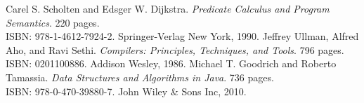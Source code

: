 \documentclass{article}
\begin{document}
\begin{thebibliography}{99}
 Carel S. Scholten and Edsger W. Dijkstra. \emph{Predicate Calculus and Program Semantics}. 220 pages. \\ISBN: 978-1-4612-7924-2. Springer-Verlag New York, 1990.
 Jeffrey Ullman, Alfred Aho, and Ravi Sethi. \emph{Compilers: Principles, Techniques, and Tools}. 796 pages. \\ISBN: 0201100886. Addison Wesley, 1986.
 Michael T. Goodrich and Roberto Tamassia. \emph{Data Structures and Algorithms in Java}. 736 pages. \\ISBN: 978-0-470-39880-7. John Wiley \& Sons Inc, 2010.
\end{thebibliography}
\end{document}
